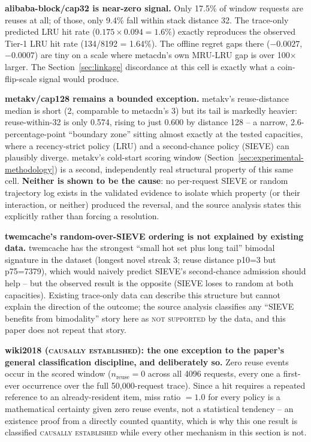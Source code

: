 \textbf{alibaba-block/cap32 is near-zero signal.} Only 17.5\% of window requests are
reuses at all; of those, only 9.4\% fall within stack distance 32. The
trace-only predicted LRU hit rate ($0.175 \times 0.094 = 1.6\%$) exactly
reproduces the observed Tier-1 LRU hit rate (134/8192 = 1.64\%). The
offline regret gaps there ($-0.0027$, $-0.0007$) are tiny on a scale where
metacdn's own MRU-LRU gap is over 100$\times$ larger. The
Section~\ref{sec:linkage} discordance at this cell is exactly what a
coin-flip-scale signal would produce.

\textbf{metakv/cap128 remains a bounded exception.} metakv's reuse-distance median is short (2, comparable to
metacdn's 3) but its tail is markedly heavier: reuse-within-32 is only
0.574, rising to just 0.600 by distance 128 -- a narrow, 2.6-percentage-point
``boundary zone'' sitting almost exactly at the tested capacities, where a
recency-strict policy (LRU) and a second-chance policy (SIEVE) can
plausibly diverge. metakv's cold-start scoring window
(Section~\ref{sec:experimental-methodology}) is a second, independently
real structural property of this same cell. \textbf{Neither is shown to be
the cause}: no per-request SIEVE or random trajectory log exists in the
validated evidence to isolate which property (or their interaction, or
neither) produced the reversal, and the source analysis states this
explicitly rather than forcing a resolution.

\textbf{twemcache's random-over-SIEVE ordering is not explained by
existing data.} twemcache has the strongest ``small hot set plus long
tail'' bimodal signature in the dataset (longest novel streak 3; reuse
distance p10=3 but p75=7379), which would naively predict SIEVE's
second-chance admission should help -- but the observed result is the
opposite (SIEVE loses to random at both capacities). Existing trace-only
data can describe this structure but cannot explain the direction of the
outcome; the source analysis classifies any ``SIEVE benefits from
bimodality'' story here as \textsc{not supported} by the data, and this
paper does not repeat that story.

\textbf{wiki2018 (\textsc{causally established}): the one exception to the
paper's general classification discipline, and deliberately so.} Zero
reuse events occur in the scored window ($n_{\text{reuse}}=0$ across all
4096 requests, every one a first-ever occurrence over the full 50{,}000-request
trace). Since a hit requires a repeated reference to an already-resident
item, miss ratio $=1.0$ for every policy is a mathematical certainty given
zero reuse events, not a statistical tendency -- an existence proof from a
directly counted quantity, which is why this one result is classified
\textsc{causally established} while every other mechanism in this section
is not.
